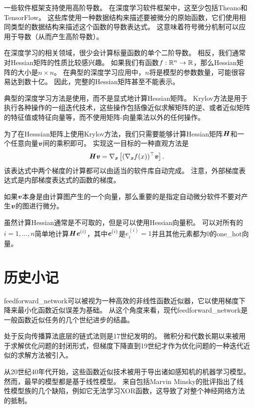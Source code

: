 一些软件框架支持使用高阶导数。 
在深度学习软件框架中，这至少包括Theano和TensorFlow。
这些库使用一种数据结构来描述要被微分的原始函数，它们使用相同类型的数据结构来描述这个函数的导数表达式。
这意味着符号微分机制可以应用于导数（从而产生高阶导数）。

在深度学习的相关领域，很少会计算标量函数的单个二阶导数。
相反，我们通常对Hessian矩阵的性质比较感兴趣。
如果我们有函数$f:\mathbb{R}^n \to \mathbb{R}$，那么Hessian矩阵的大小是$n\times n$。
在典型的深度学习应用中，$n$将是模型的参数数量，可能很容易达到数十亿。
因此，完整的Hessian矩阵甚至不能表示。

典型的深度学习方法是使用，而不是显式地计算Hessian矩阵。
Krylov方法是用于执行各种操作的一组迭代技术，这些操作包括像近似求解矩阵的逆、或者近似矩阵的特征值或特征向量等，而不使用矩阵-向量乘法以外的任何操作。

为了在Hesssian矩阵上使用Krylov方法，我们只需要能够计算Hessian矩阵$\boldsymbol{\mathit{H}}$和一个任意向量$\boldsymbol{\mathit{v}}$间的乘积即可。
实现这一目标的一种直观方法\citep{christianson1992automatic}是
\begin{equation}
  \boldsymbol{\mathit{H}} \boldsymbol{\mathit{v}}=\nabla_{\boldsymbol{\mathit{x}}} \left [ (\nabla_{\boldsymbol{\mathit{x}}} f(x))^\top \boldsymbol{\mathit{v}}\right ].
\end{equation}
该表达式中两个梯度的计算都可以由适当的软件库自动完成。
注意，外部梯度表达式是内部梯度表达式的函数的梯度。

如果$\boldsymbol{\mathit{v}}$本身是由计算图产生的一个向量，那么重要的是指定自动微分软件不要对产生$\boldsymbol{\mathit{v}}$的图进行微分。

虽然计算Hessian通常是不可取的，但是可以使用Hessian向量积。
可以对所有的$i=1,\ldots,n$简单地计算$\boldsymbol{\mathit{H}} \boldsymbol{\mathit{e}}^{(i)}$，其中$\boldsymbol{\mathit{e}}^{(i)}$是$e_i^{(i)}=1$并且其他元素都为0的\gls{one_hot}向量。

\section{历史小记}
\label{sec:historical_notes}

\gls{feedforward_network}可以被视为一种高效的非线性函数近似器，它以使用梯度下降来最小化函数近似误差为基础。
从这个角度来看，现代\gls{feedforward_network}是一般函数近似任务的几个世纪进步的结晶。
  
  
处于反向传播算法底层的链式法则是17世纪发明的\citep{Leibniz-1676,LHopital-1696}。
微积分和代数长期以来被用于求解优化问题的封闭形式，但梯度下降直到19世纪才作为优化问题的一种迭代近似的求解方法被引入\citep{cauchy1847}。

从20世纪40年代开始，这些函数近似技术被用于导出诸如感知机的机器学习模型。 
然而，最早的模型都是基于线性模型。 
来自包括Marvin Minsky的批评指出了线性模型族的几个缺陷，例如它无法学习XOR函数，这导致了对整个神经网络方法的抵制。

